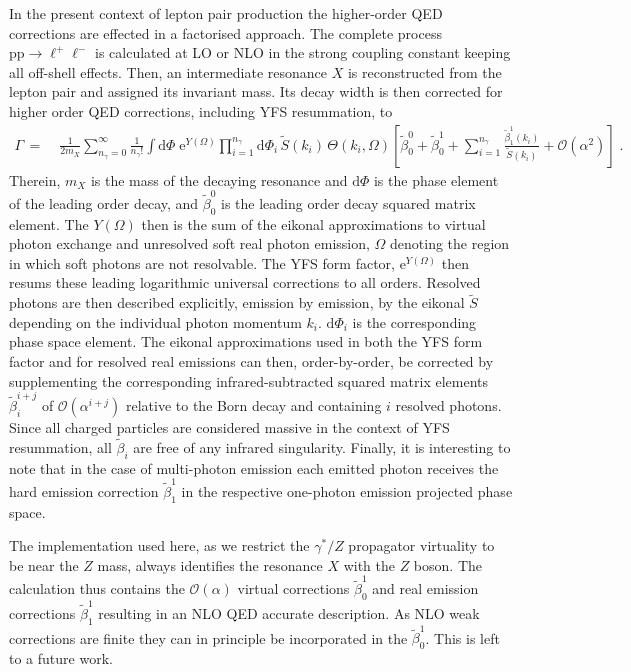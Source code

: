 \documentclass[11pt]{cernrep}
\newcommand{\order}{\ensuremath{\mathcal{O}}}
\newcommand{\rd}{\ensuremath{\mathrm{d}}} %
\newcommand{\re}{\ensuremath{\mathrm{e}}} %
\DeclareRobustCommand{\Plp}{{\ensuremath{\ell^+}}}
\DeclareRobustCommand{\Plm}{{\ensuremath{\ell^-}}}
\DeclareRobustCommand{\Pp}{{\ensuremath{\mathrm{p}}}}
\begin{document}
In the present context of lepton pair production the higher-order 
QED corrections are effected in a factorised approach. The complete 
process $\Pp\Pp\to\Plp\Plm$ is calculated at LO or NLO in the strong 
coupling constant keeping all off-shell effects. Then, an intermediate 
resonance $X$ is reconstructed from the lepton pair and assigned its 
invariant mass. Its decay width is then corrected for higher order 
QED corrections, including YFS resummation, to 
\begin{equation}
  \begin{split}\label{eq:dyew:comp:yfs}
    \Gamma
    \,=\;&
      \frac{1}{2m_X}\sum\limits_{n_\gamma=0}^\infty\frac{1}{n_\gamma !}
      \int\rd\Phi\;\re^{Y(\Omega)}
      \prod\limits_{i=1}^{n_\gamma}\rd\Phi_i\,\tilde{S}(k_i)\,\Theta(k_i,\Omega)
      \left[
        \tilde\beta_0^0
        +\tilde\beta_0^1
        +\sum\limits_{i=1}^{n_\gamma}\frac{\tilde\beta_1^1(k_i)}{\tilde{S}(k_i)}
        +\order(\alpha^2)
      \right]\;.
  \end{split}
\end{equation}
Therein, $m_X$ is the mass of the decaying resonance and $\rd\Phi$ 
is the phase element of the leading order decay, and $\tilde\beta_0^0$ is 
the leading order decay squared matrix element. The $Y(\Omega)$ then 
is the sum of the eikonal approximations to virtual photon exchange and 
unresolved soft real photon emission, $\Omega$ denoting the region in which 
soft photons are not resolvable. The YFS form factor, $\re^{Y(\Omega)}$ then 
resums these leading logarithmic universal corrections to all orders. 
Resolved photons are then described explicitly, emission by emission, 
by the eikonal $\tilde{S}$ depending on the individual photon momentum 
$k_i$. $\rd\Phi_i$ is the corresponding phase space element. The 
eikonal approximations used in both the YFS form factor and for 
resolved real emissions can then, order-by-order, be corrected by 
supplementing the corresponding infrared-subtracted squared matrix 
elements $\tilde\beta_i^{i+j}$ of $\order(\alpha^{i+j})$ relative to 
the Born decay and containing $i$ resolved photons. Since all charged 
particles are considered massive in the context of YFS resummation, 
all $\tilde\beta_i$ are free of any infrared singularity. Finally, it is 
interesting to note that in the case of multi-photon emission 
each emitted photon receives the hard emission correction $\tilde\beta_1^1$ 
in the respective one-photon emission projected phase space.

The implementation used here, as we restrict the $\gamma^*/Z$ propagator 
virtuality to be near the $Z$ mass, always identifies the resonance $X$ with 
the $Z$ boson. The calculation thus contains the $\order(\alpha)$ virtual 
corrections $\tilde\beta_0^1$ and real emission corrections $\tilde\beta_1^1$ 
resulting in an NLO QED accurate description. As NLO weak corrections 
are finite they can in principle be incorporated in the $\tilde\beta_0^1$. 
This is left to a future work.
\end{document}
